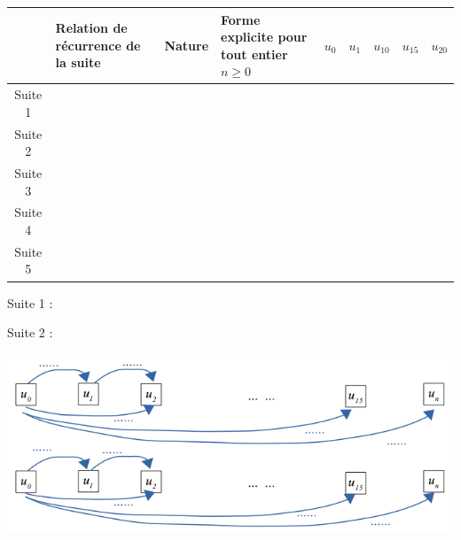 \documentclass[a4paper,11pt,exos]{nsi} %
\begin{document}
\newpage
{}
\begin{tabular}{|c|p{2.5cm}|p{2.5cm}|p{2.5cm}|c|c|c|c|c|}
	\hline
	 & Relation de récurrence de la suite & \centering Nature & Forme explicite pour tout entier $n\geqslant0$ & $u_0$ & $u_1$ & $u_{10}$ & $u_{15}$ & $u_{20}$ \\
	 \hline
	 Suite 1 & & & & \hspace{.9cm} & \hspace{.9cm} & \hspace{.9cm} & \hspace{.9cm} & \hspace{.9cm} \\
	 \hline
	 Suite 2 & & & & \hspace{.9cm} & \hspace{.9cm} & \hspace{.9cm} & \hspace{.9cm} & \hspace{.9cm} \\
	 \hline
	 Suite 3 & & & & \hspace{.9cm} & \hspace{.9cm} & \hspace{.9cm} & \hspace{.9cm} & \hspace{.9cm} \\
	 \hline
	 Suite 4 & & & & \hspace{.9cm} & \hspace{.9cm} & \hspace{.9cm} & \hspace{.9cm} & \hspace{.9cm} \\
	 \hline
	 Suite 5 & & & & \hspace{.9cm} & \hspace{.9cm} & \hspace{.9cm} & \hspace{.9cm} & \hspace{.9cm} \\
	 \hline
\end{tabular}

\vspace{1cm}

\begin{minipage}{2cm}
	Suite 1 :\\
	\vspace{1.8cm}
	
	Suite 2 :
\end{minipage}
\begin{minipage}{15cm}
	\includegraphics[width=15cm]{schema}
\end{minipage}
\end{document}
